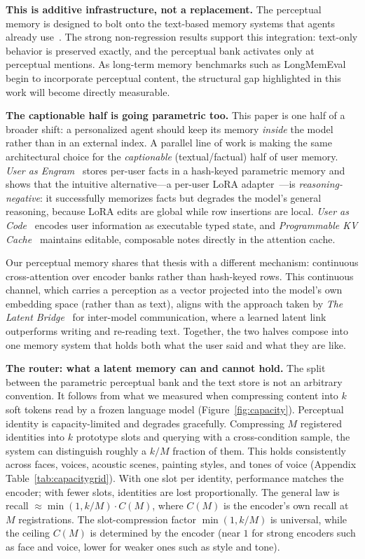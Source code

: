 \textbf{This is additive infrastructure, not a replacement.} The perceptual memory is designed to bolt onto the text-based memory systems that agents already use~\citep{mem0,memllm,memgpt,letta}. The strong non-regression results support this integration: text-only behavior is preserved exactly, and the perceptual bank activates only at perceptual mentions. As long-term memory benchmarks such as LongMemEval~\citep{longmemeval} begin to incorporate perceptual content, the structural gap highlighted in this work will become directly measurable.

\textbf{The captionable half is going parametric too.} This paper is one half of a broader shift: a personalized agent should keep its memory \emph{inside} the model rather than in an external index. A parallel line of work is making the same architectural choice for the \emph{captionable} (textual/factual) half of user memory. \emph{User as Engram}~\citep{userengram} stores per-user facts in a hash-keyed parametric memory and shows that the intuitive alternative---a per-user LoRA adapter~\citep{lora}---is \emph{reasoning-negative}: it successfully memorizes facts but degrades the model's general reasoning, because LoRA edits are global while row insertions are local. \emph{User as Code}~\citep{usercode} encodes user information as executable typed state, and \emph{Programmable KV Cache}~\citep{editablekv} maintains editable, composable notes directly in the attention cache.

Our perceptual memory shares that thesis with a different mechanism: continuous cross-attention over encoder banks rather than hash-keyed rows. This continuous channel, which carries a perception as a vector projected into the model's own embedding space (rather than as text), aligns with the approach taken by \emph{The Latent Bridge}~\citep{latentbridge} for inter-model communication, where a learned latent link outperforms writing and re-reading text. Together, the two halves compose into one memory system that holds both what the user said and what they are like.

\textbf{The router: what a latent memory can and cannot hold.} The split between the parametric perceptual bank and the text store is not an arbitrary convention. It follows from what we measured when compressing content into $k$ soft tokens read by a frozen language model (Figure~\ref{fig:capacity}). Perceptual identity is capacity-limited and degrades gracefully. Compressing $M$ registered identities into $k$ prototype slots and querying with a cross-condition sample, the system can distinguish roughly a $k/M$ fraction of them. This holds consistently across faces, voices, acoustic scenes, painting styles, and tones of voice (Appendix Table~\ref{tab:capacitygrid}). With one slot per identity, performance matches the encoder; with fewer slots, identities are lost proportionally. The general law is recall $\approx \min(1, k/M)\cdot C(M)$, where $C(M)$ is the encoder's own recall at $M$ registrations. The slot-compression factor $\min(1,k/M)$ is universal, while the ceiling $C(M)$ is determined by the encoder (near $1$ for strong encoders such as face and voice, lower for weaker ones such as style and tone).

